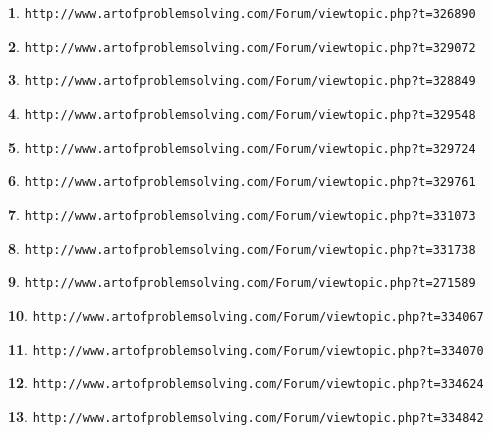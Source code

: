 \documentclass{article}
\theoremstyle{definition}
\newtheorem{s}{}
\begin{document}
\begin{s}
\texttt{http://www.artofproblemsolving.com/Forum/viewtopic.php?t=326890}
\end{s}

\begin{s}
\texttt{http://www.artofproblemsolving.com/Forum/viewtopic.php?t=329072}
\end{s}

\begin{s}
\texttt{http://www.artofproblemsolving.com/Forum/viewtopic.php?t=328849}
\end{s}

\begin{s}
\texttt{http://www.artofproblemsolving.com/Forum/viewtopic.php?t=329548}
\end{s}

\begin{s}
\texttt{http://www.artofproblemsolving.com/Forum/viewtopic.php?t=329724}
\end{s}

\begin{s}
\texttt{http://www.artofproblemsolving.com/Forum/viewtopic.php?t=329761}
\end{s}

\begin{s}
\texttt{http://www.artofproblemsolving.com/Forum/viewtopic.php?t=331073}
\end{s}

\begin{s}
\texttt{http://www.artofproblemsolving.com/Forum/viewtopic.php?t=331738}
\end{s}

\begin{s}
\texttt{http://www.artofproblemsolving.com/Forum/viewtopic.php?t=271589}
\end{s}

\begin{s}
\texttt{http://www.artofproblemsolving.com/Forum/viewtopic.php?t=334067}
\end{s}


\begin{s}
\texttt{http://www.artofproblemsolving.com/Forum/viewtopic.php?t=334070}
\end{s}



\begin{s}
\texttt{http://www.artofproblemsolving.com/Forum/viewtopic.php?t=334624}
\end{s}


\begin{s}
\texttt{http://www.artofproblemsolving.com/Forum/viewtopic.php?t=334842}
\end{s}
\end{document}
